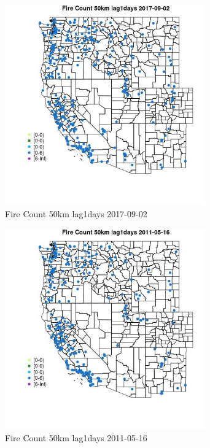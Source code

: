 \begin{figure} 
\centering  
\includegraphics[width=0.77\textwidth]{Code_Outputs/Report_ML_input_PM25_Step4_part_e_de_duplicated_aves_compiled_2019-05-21wNAs_MapObsFire_Count_50km_lag1days2017-09-02.jpg} 
\caption{\label{fig:Report_ML_input_PM25_Step4_part_e_de_duplicated_aves_compiled_2019-05-21wNAsMapObsFire_Count_50km_lag1days2017-09-02}Fire Count 50km lag1days 2017-09-02} 
\end{figure} 
 

\clearpage 

\begin{figure} 
\centering  
\includegraphics[width=0.77\textwidth]{Code_Outputs/Report_ML_input_PM25_Step4_part_e_de_duplicated_aves_compiled_2019-05-21wNAs_MapObsFire_Count_50km_lag1days2011-05-16.jpg} 
\caption{\label{fig:Report_ML_input_PM25_Step4_part_e_de_duplicated_aves_compiled_2019-05-21wNAsMapObsFire_Count_50km_lag1days2011-05-16}Fire Count 50km lag1days 2011-05-16} 
\end{figure} 
 

